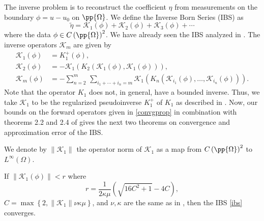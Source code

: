 \documentclass[a4paper, 12pt]{article}
\begin{document}
The inverse problem is to reconstruct the coefficient $\eta$ from measurements on the boundary $\phi = u - u_0$ on $\pp{\Omega}$.
We define the Inverse Born Series (IBS) as 
\begin{equation}\label{ibs}
	\tilde{\eta} = \mathcal{K}_{1}\left(\phi\right) + \mathcal{K}_{2}\left( \phi \right) + \mathcal{K}_{3}\left( \phi \right) + \cdots
\end{equation}
where the data $\phi \in  C\left( \pp{\Omega} \right) ^2$.
We have already seen the IBS analyzed in \cite{Hoskins_2022, Moskow_2008}. The inverse operators $\mathcal{K}_{m}$ are given by
\begin{align*}
	\mathcal{K}_{1}\left( \phi \right) &= K_1^{+}\left( \phi \right),\\
	\mathcal{K}_{2}\left( \phi \right) &= -\mathcal{K}_1\left( K_2\left( \mathcal{K}_1\left( \phi \right) , \mathcal{K}_{1}\left( \phi \right)  \right)  \right) ,\\
	\mathcal{K}_{m}\left( \phi \right)  &=  -\sum_{n=2}^{m} \, \sum_{i_1 + \cdots + i_{n} = m} \mathcal{K}_{1}\left(K_{n}\left( \mathcal{K}_{i_{1}}\left( \phi \right) , \ldots, \mathcal{K}_{i_{n}}\left( \phi \right)  \right)\right)
.\end{align*}
Note that the operator $K_1$ does not, in general, have a bounded inverse. Thus, we take $\mathcal{K}_{1}$ to be the regularized pseudoinverse $K_{1}^{+}$ of $K_1$ as described in \cite{MoskowSchotland+2019+273+296}.
Now, our bounds on the forward operators given in \cref{convgprop} in combination with theorems 2.2 and 2.4 of \cite{Hoskins_2022} gives the next two theorems on convergence and approximation error of the IBS.
\begin{note}
	We denote by $\lVert \mathcal{K}_{1} \rVert$ the operator norm of $\mathcal{K}_{1}$ as a map from $C\left( \pp{\Omega} \right)^2$ to $L^{\infty}\left( \Omega \right)$.
\end{note}

\begin{thm}\label{ibsconvg}
	If $\lVert \mathcal{K_1}\left( \phi \right)  \rVert< r$ where
	\[
	r = \frac{1}{2\kappa \mu}\left( \sqrt{16 C^2 + 1} -4C \right)
	,\] 
	$C = \max \left\{ 2, \lVert \mathcal{K}_{1}\rVert \nu \kappa \mu \right\} $, and $\nu, \kappa$ are the same as in , then the IBS \cref{ibs} converges.
\end{thm}
\end{document}
